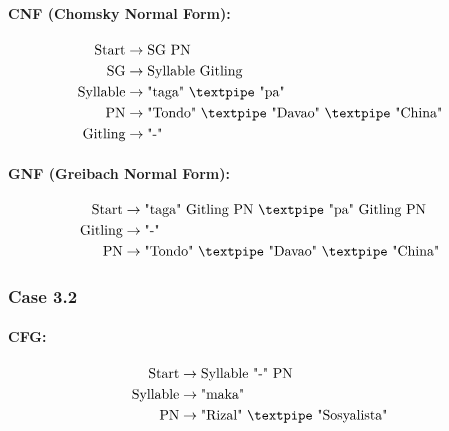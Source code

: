 \paragraph{CNF (Chomsky Normal Form):}

\begin{equation*}
    \begin{aligned}
        \text{Start}   & \rightarrow \text{SG PN} \\
        \text{SG}      & \rightarrow \text{Syllable Gitling}\\
        \text{Syllable}    & \rightarrow \text{"taga" {\textpipe} "pa"}\\
        \text{PN} & \rightarrow \text{"Tondo" {\textpipe} "Davao" {\textpipe} "China"}   \\
        \text{Gitling} & \rightarrow \text{"-"}\\
    \end{aligned}
\end{equation*}

\paragraph{GNF (Greibach Normal Form):}

\begin{equation*}
    \begin{aligned}
        \text{Start}   & \rightarrow \text{"taga" Gitling PN {\textpipe} "pa" Gitling PN}\\
        \text{Gitling} & \rightarrow \text{"-"}\\
        \text{PN} & \rightarrow \text{"Tondo" {\textpipe} "Davao" {\textpipe} "China"}   \\
    \end{aligned}
\end{equation*}

\subsubsection{Case 3.2}

\paragraph{CFG:}

\begin{equation*}
    \begin{aligned}
        \text{Start}  & \rightarrow \text{Syllable "-" PN}   \\
        \text{Syllable}    & \rightarrow \text{"maka"}\\
        \text{PN} & \rightarrow \text{"Rizal" {\textpipe} "Sosyalista"}   \\
    \end{aligned}
\end{equation*}

